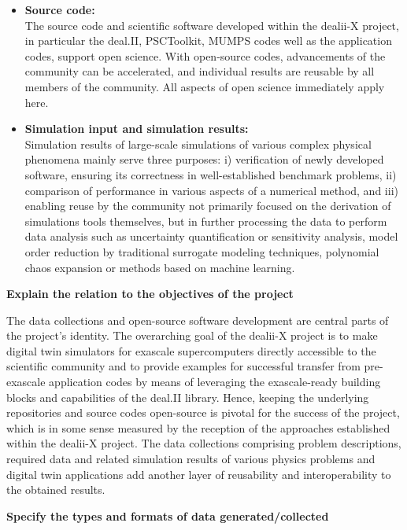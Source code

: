 \documentclass[a4paper,12pt]{article}
\begin{document}
\begin{itemize}
    \item  \textbf{Source code:}\\
    The source code and scientific software developed within the dealii-X project, in particular the deal.II, PSCToolkit, MUMPS codes well as the application codes, support open science. With open-source codes, advancements of the community can be accelerated, and individual results are reusable by all members of the community. All aspects of open science immediately apply here.  

    \item  \textbf{Simulation input and simulation results:}\\
    Simulation results of large-scale simulations of various complex physical phenomena mainly serve three purposes: i) verification of newly developed software, ensuring its correctness in well-established benchmark problems, ii) comparison of performance in various aspects of a numerical method, and iii) enabling reuse by the community not primarily focused on the derivation of simulations tools themselves, but in further processing the data to perform data analysis such as uncertainty quantification or sensitivity analysis, model order reduction by traditional surrogate modeling techniques, polynomial chaos expansion or methods based on machine learning.
\end{itemize}

\noindent \textbf{Explain the relation to the objectives of the project}

The data collections and open-source software development are central parts of the project's identity. The overarching goal of the dealii-X project is to make digital twin simulators for exascale supercomputers directly accessible to the scientific community and to provide examples for successful transfer from pre-exascale application codes by means of leveraging the exascale-ready building blocks and capabilities of the deal.II library. Hence, keeping the underlying repositories and source codes open-source is pivotal for the success of the project, which is in some sense measured by the reception of the approaches established within the dealii-X project. The data collections comprising problem descriptions, required data and related simulation results of various physics problems and digital twin applications add another layer of reusability and interoperability to the obtained results.

\noindent \textbf{Specify the types and formats of data generated/collected}
\end{document}
